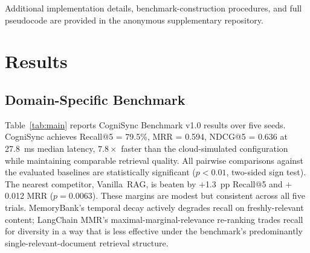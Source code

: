 \documentclass[sigconf]{acmart}
\begin{document}
Additional implementation details, benchmark-construction procedures,
and full pseudocode are provided in the anonymous supplementary
repository.

\section{Results}

\subsection{Domain-Specific Benchmark}
\label{sec:domain}

Table~\ref{tab:main} reports CogniSync Benchmark v1.0 results over five
seeds. CogniSync achieves Recall@5 = 79.5\%, MRR = 0.594, NDCG@5 =
0.636 at 27.8~ms median latency, $7.8\times$ faster than the cloud-simulated configuration while maintaining comparable retrieval quality. All pairwise comparisons against the evaluated baselines are statistically significant ($p < 0.01$, two-sided sign test). The nearest
competitor, Vanilla~RAG, is beaten by $+$1.3~pp Recall@5 and $+$0.012
MRR ($p = 0.0063$). These margins are modest but consistent across all
five trials. MemoryBank's temporal decay actively degrades recall on
freshly-relevant content; LangChain MMR's maximal-marginal-relevance
re-ranking trades recall for diversity in a way that is less effective under the benchmark's predominantly single-relevant-document retrieval structure.
\end{document}
